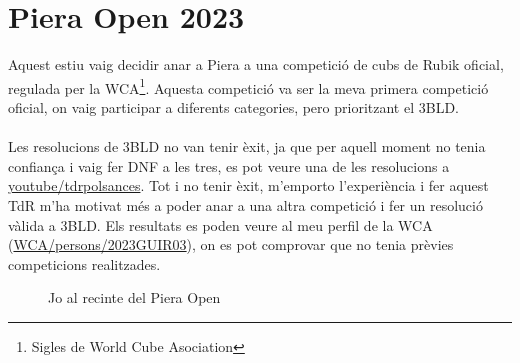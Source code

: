 \chapter{Piera Open 2023}

Aquest estiu vaig decidir anar a Piera a una competició de cubs de Rubik oficial, regulada per la WCA\footnote{Sigles de World Cube Asociation}. Aquesta competició va ser la meva primera competició oficial, on vaig participar a diferents categories, pero prioritzant el 3BLD.
\\\\Les resolucions de 3BLD no van tenir èxit, ja que per aquell moment no tenia confiança i vaig fer DNF a les tres, es pot veure una de les resolucions a \href{https://www.youtube.com/@TDRPolSances}{youtube/tdrpolsances}.
Tot i no tenir èxit, m'emporto l'experiència i fer aquest TdR m'ha motivat més a poder anar a una altra competició i fer un resolució vàlida a 3BLD. Els resultats es poden veure al meu perfil de la WCA (\href{https://www.worldcubeassociation.org/persons/2023GUIR03?event=333bf}{WCA/persons/2023GUIR03}), on es pot comprovar que no tenia prèvies competicions realitzades.

\begin{figure}[!ht]
    \centering
    \caption{Jo al recinte del Piera Open}
    \label{fig:piera}
\end{figure}



